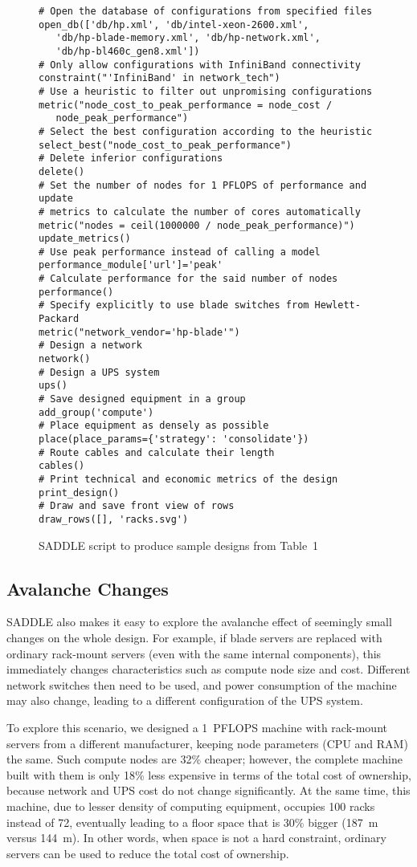 \documentclass[runningheads,a4paper]{llncs}
\begin{document}
\begin{figure}
\label{saddle-example-script}
\begin{verbatim}
# Open the database of configurations from specified files
open_db(['db/hp.xml', 'db/intel-xeon-2600.xml',
   'db/hp-blade-memory.xml', 'db/hp-network.xml',
   'db/hp-bl460c_gen8.xml'])
# Only allow configurations with InfiniBand connectivity
constraint("'InfiniBand' in network_tech")
# Use a heuristic to filter out unpromising configurations
metric("node_cost_to_peak_performance = node_cost /
   node_peak_performance")
# Select the best configuration according to the heuristic
select_best("node_cost_to_peak_performance")
# Delete inferior configurations
delete()
# Set the number of nodes for 1 PFLOPS of performance and update
# metrics to calculate the number of cores automatically
metric("nodes = ceil(1000000 / node_peak_performance)")
update_metrics()
# Use peak performance instead of calling a model
performance_module['url']='peak'
# Calculate performance for the said number of nodes
performance()
# Specify explicitly to use blade switches from Hewlett-Packard
metric("network_vendor='hp-blade'")
# Design a network
network()
# Design a UPS system
ups()
# Save designed equipment in a group
add_group('compute')
# Place equipment as densely as possible
place(place_params={'strategy': 'consolidate'})
# Route cables and calculate their length
cables()
# Print technical and economic metrics of the design
print_design()
# Draw and save front view of rows
draw_rows([], 'racks.svg')
\end{verbatim}
\caption{SADDLE script to produce sample designs from Table~1}
\end{figure}

\subsection{Avalanche Changes}

SADDLE also makes it easy to explore the avalanche effect of seemingly small changes on the whole design. For example, if blade servers are replaced with ordinary rack-mount servers (even with the same internal components), this immediately changes characteristics such as compute node size and cost. Different network switches then need to be used, and power consumption of the machine may also change, leading to a different configuration of the UPS system.

To explore this scenario, we designed a 1~PFLOPS machine with rack-mount servers from a different manufacturer, keeping node parameters (CPU and RAM) the same. Such compute nodes are 32\% cheaper; however, the complete machine built with them is only 18\% less expensive in terms of the total cost of ownership, because network and UPS cost do not change significantly. At the same time, this machine, due to lesser density of computing equipment, occupies 100 racks instead of 72, eventually leading to a floor space that is 30\% bigger (187~m versus 144~m). In other words, when space is not a hard constraint, ordinary servers can be used to reduce the total cost of ownership.
\end{document}
